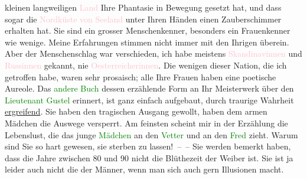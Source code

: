                     kleinen langweiligen \textcolor{pink}{Land}{}
                    Ihre Phantasie in Bewegung gesetzt hat, und dass sogar die \textcolor{pink}{Nordküste von \textcolor{pink}{Seeland}{}\ledrightnote{\textcolor{pink}{Seeland}}}{} unter Ihren Händen einen Zauberschimmer erhalten hat.\pend
           \pstart
           Sie sind ein grosser Menschenkenner, besonders ein Frauenkenner wie wenige. Meine
                    Erfahrungen stimmen nicht immer mit den Ihrigen überein. Aber der Menschenschlag
                    war verschieden, ich habe meistens \textcolor{pink}{Skandinavinnen}{}\ledrightnote{\textcolor{pink}{Skandinavien}} und \textcolor{pink}{Russinnen}{}\ledrightnote{\textcolor{pink}{Russland}}
                    gekannt, nie \textcolor{pink}{Oesterreicherinnen}{}\ledrightnote{\textcolor{pink}{Österreich}}. Die wenigen
                    dieser Nation, die ich getroffen habe, waren sehr prosaisch; alle Ihre Frauen
                    haben eine poetische Aureole.\pend
           \pstart
           Das \textcolor{green}{andere Buch}{} dessen
                    erzählende Form an Ihr Meisterwerk über den {\pb}\textcolor{green}{Lieutenant Gustel}{}\ledrightnote{\textcolor{green}{Lieutenant Gustl. Novelle}} erinnert, ist ganz einfach
                    aufgebaut, durch traurige Wahrheit \uline{ergreifend}.
                    Sie haben den tragischen Ausgang gewollt, haben dem armen Mädchen die Auswege
                    versperrt. Am feinsten scheint mir in der Erzählung die Lebenslust, die das
                    junge \textcolor{green}{Mädchen}{} an den \textcolor{green}{Vetter}{} und an den \textcolor{green}{Fred}{} zieht. Warum sind Sie
                    so hart gewesen, sie sterben zu lassen! – –\pend
           \pstart
           Sie werden bemerkt haben, dass die Jahre zwischen 80 und 90 nicht die Blüthezeit
                    der Weiber ist. Sie ist ja leider auch nicht die der Männer, wenn man sich auch
                    gern Illusionen macht.\pend
           \pstart
